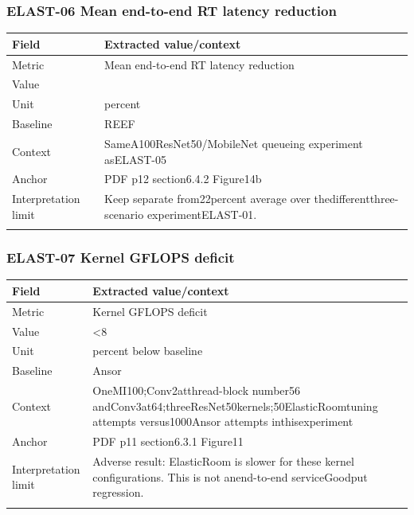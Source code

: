 \subsubsection*{ELAST-06 Mean end-to-end RT latency reduction}
\begin{longtable}{>{\raggedright\arraybackslash}p{}>{\raggedright\arraybackslash}p{}}
\toprule
\textbf{Field} & \textbf{Extracted value/context}\\\midrule\endhead
Metric & Mean end-to-end RT latency reduction\\\addlinespace
Value & 19\\\addlinespace
Unit & percent\\\addlinespace
Baseline & REEF\\\addlinespace
Context & SameA100ResNet50/MobileNet queueing experiment asELAST-05\\\addlinespace
Anchor & PDF p12 section6.4.2 Figure14b\\\addlinespace
Interpretation limit & Keep separate from22percent average over thedifferentthree-scenario experimentELAST-01.\\\addlinespace
\bottomrule\end{longtable}
\subsubsection*{ELAST-07 Kernel GFLOPS deficit}
\begin{longtable}{>{\raggedright\arraybackslash}p{}>{\raggedright\arraybackslash}p{}}
\toprule
\textbf{Field} & \textbf{Extracted value/context}\\\midrule\endhead
Metric & Kernel GFLOPS deficit\\\addlinespace
Value & <8\\\addlinespace
Unit & percent below baseline\\\addlinespace
Baseline & Ansor\\\addlinespace
Context & OneMI100;\allowbreak{}Conv2atthread-block number56 andConv3at64;\allowbreak{}threeResNet50kernels;\allowbreak{}50ElasticRoomtuning attempts versus1000Ansor attempts inthisexperiment\\\addlinespace
Anchor & PDF p11 section6.3.1 Figure11\\\addlinespace
Interpretation limit & Adverse result: ElasticRoom is slower for these kernel configurations. This is not anend-to-end serviceGoodput regression.\\\addlinespace
\bottomrule\end{longtable}
